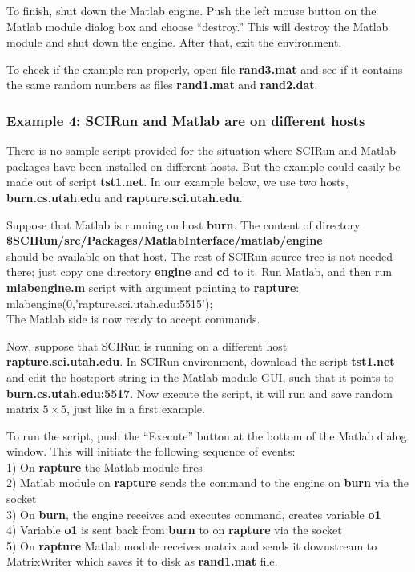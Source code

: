 To finish, shut down the Matlab engine.
Push the left mouse button on the
Matlab module dialog box and choose ``destroy.'' This will destroy
the Matlab module and shut down the engine. After that, exit
the \sr{} environment.

To check if the example ran properly, open file {\bf rand3.mat}
and see if it contains the same random numbers as files {\bf rand1.mat}
and {\bf rand2.dat}.

\subsubsection{Example 4: SCIRun and Matlab are on different hosts} \indent

There is no sample script provided for the situation where SCIRun and
Matlab packages have been installed on different hosts. But the example
could easily be made out of script {\bf tst1.net}.  In our example
below, we use two hosts, {\bf burn.cs.utah.edu} and
{\bf rapture.sci.utah.edu}.

Suppose that Matlab is running on host {\bf burn}. The
content of directory \\
{\bf \$SCIRun/src/Packages/MatlabInterface/matlab/engine} \\
should be available on that host. The rest of SCIRun source tree is
not needed there; just copy one directory {\bf engine} and {\bf cd} to it. 
Run Matlab, and then run {\bf mlabengine.m} script with argument
pointing to {\bf rapture}: \\
mlabengine(0,'rapture.sci.utah.edu:5515'); \\
The Matlab side is now ready to accept commands.

Now, suppose that SCIRun is running on a different host \\
{\bf rapture.sci.utah.edu}. 
In SCIRun environment, download the script {\bf tst1.net} 
and edit the host:port
string in the Matlab module GUI, such that it points to 
{\bf burn.cs.utah.edu:5517}. Now execute the script, it will
run and save random matrix $5\times 5$, just like in a first
example.

To run the script, push the ``Execute'' button at the bottom of the
Matlab dialog window. This will initiate the following
sequence of events: \\
1) On {\bf rapture} the Matlab module fires \\
2) Matlab module on {\bf rapture} sends the command to the engine on
{\bf burn} via the socket\\
3) On {\bf burn}, the engine receives and executes command, creates variable {\bf o1} \\
4) Variable {\bf o1} is sent back from {\bf burn} to \sr{} on {\bf rapture} via the socket \\
5) On {\bf rapture} \sr{} Matlab module receives matrix and sends it downstream
   to MatrixWriter which saves it to disk as {\bf rand1.mat} file. \\

